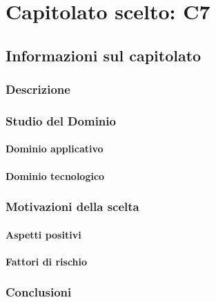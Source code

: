 \section{Capitolato scelto: C7}
	\subsection{Informazioni sul capitolato}
		\subsubsection{Descrizione}
		\subsubsection{Studio del Dominio}
			\paragraph{Dominio applicativo}
			\paragraph{Dominio tecnologico}
		\subsubsection{Motivazioni della scelta}
			\paragraph{Aspetti positivi}
			\paragraph{Fattori di rischio}
		\subsubsection{Conclusioni}	
			